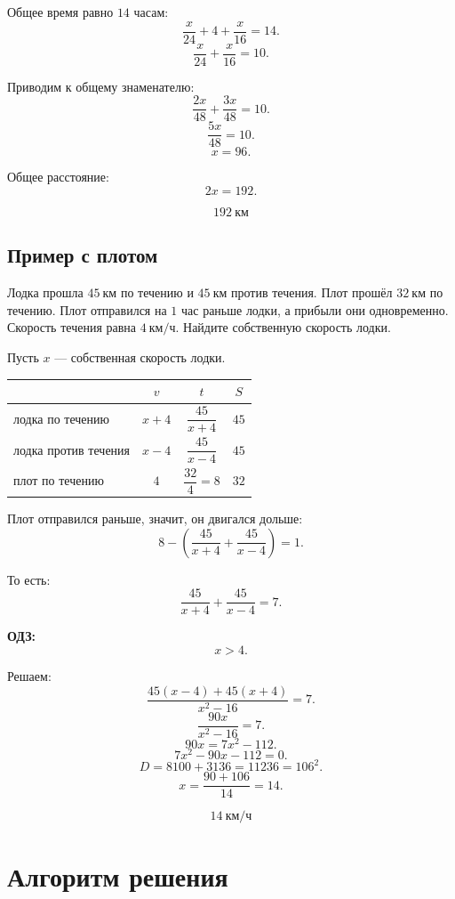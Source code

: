 \documentclass[a4paper,12pt]{article}
\newcommand{\important}[1]{\textcolor{darkaccent}{\textbf{#1}}}
\newcommand{\kmh}{\text{км/ч}}
\newcommand{\km}{\text{км}}
\begin{document}
Общее время равно $14$ часам:
\[
\frac{x}{24}+4+\frac{x}{16}=14.
\]
\[
\frac{x}{24}+\frac{x}{16}=10.
\]

Приводим к общему знаменателю:
\[
\frac{2x}{48}+\frac{3x}{48}=10.
\]
\[
\frac{5x}{48}=10.
\]
\[
x=96.
\]

Общее расстояние:
\[
2x=192.
\]

\[
\boxed{192\ \km}
\]

\subsection{Пример с плотом}

Лодка прошла $45\ \km$ по течению и $45\ \km$ против течения. Плот прошёл $32\ \km$ по течению. Плот отправился на $1$ час раньше лодки, а прибыли они одновременно. Скорость течения равна $4\ \kmh$. Найдите собственную скорость лодки.

Пусть $x$ --- собственная скорость лодки.

\begin{center}
\renewcommand{\arraystretch}{1.35}
\begin{tabularx}{0.86\linewidth}{X c c c}
\toprule
 & $v$ & $t$ & $S$ \\
\midrule
лодка по течению & $x+4$ & $\dfrac{45}{x+4}$ & $45$ \\
лодка против течения & $x-4$ & $\dfrac{45}{x-4}$ & $45$ \\
плот по течению & $4$ & $\dfrac{32}{4}=8$ & $32$ \\
\bottomrule
\end{tabularx}
\end{center}

Плот отправился раньше, значит, он двигался дольше:
\[
8-\left(\frac{45}{x+4}+\frac{45}{x-4}\right)=1.
\]

То есть:
\[
\frac{45}{x+4}+\frac{45}{x-4}=7.
\]

\important{ОДЗ:}
\[
x>4.
\]

Решаем:
\[
\frac{45(x-4)+45(x+4)}{x^2-16}=7.
\]
\[
\frac{90x}{x^2-16}=7.
\]
\[
90x=7x^2-112.
\]
\[
7x^2-90x-112=0.
\]
\[
D=8100+3136=11236=106^2.
\]
\[
x=\frac{90+106}{14}=14.
\]

\[
\boxed{14\ \kmh}
\]

\section{Алгоритм решения}
\end{document}

